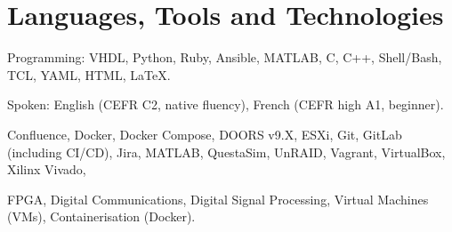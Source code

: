 %
%
\section{Languages, Tools and Technologies}
\descript{ }
Programming: \hspace{0.5em} VHDL, Python, Ruby, Ansible, MATLAB, C, C++, Shell/Bash, TCL, YAML, HTML, \LaTeX.

Spoken: \hspace{3em} English (CEFR C2, native fluency), French (CEFR high A1, beginner).

\sectionsep{}
\descript{ }
Confluence, Docker, Docker Compose, DOORS v9.X, ESXi, Git, GitLab (including CI/CD), Jira, MATLAB, QuestaSim, UnRAID, Vagrant, VirtualBox, Xilinx Vivado,

\sectionsep{}
\descript{ }
FPGA, Digital Communications, Digital Signal Processing, Virtual Machines (VMs), Containerisation (Docker).

\sectionsep
